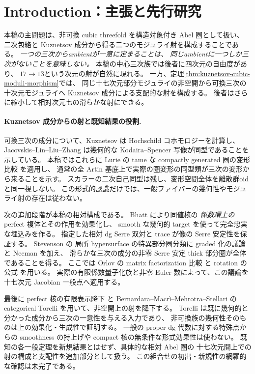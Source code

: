 \documentclass[11pt,a4paper]{ltjsarticle}
\numberwithin{equation}{section}
\begin{document}
\section{Introduction：主張と先行研究}\label{sec:intro}
本稿の主問題は、非可換 cubic threefold を構造対象付き Abel 圏として扱い、
二次包絡と Kuznetsov 成分から得る二つのモジュライ射を構成することである。
\emph{一つの三次からambientが一意に定まることは、
同じambientに一つしか三次がないことを意味しない。}
本稿の中心三次族では後者に四次元の自由度があり、
$17\longrightarrow13$という次元の射が自然に現れる。
一方、定理\ref{thm:kuznetsov-cubic-moduli-morphism}では、
同じ十七次元部分モジュライの非空開から可換三次の十次元モジュライへ
Kuznetsov 成分による支配的な射を構成する。
後者はさらに縮小して相対次元七の滑らかな射にできる。

\paragraph{Kuznetsov 成分からの射と既知結果の役割.}
可換三次の成分について、Kuznetsov \cite[Theorem~8.9]{KuznetsovHochschild}
は Hochschild コホモロジーを計算し、
Jacovskis--Lin--Liu--Zhang \cite[Theorem~4.4(2)]{JLLZInfinitesimal}
は幾何的な Kodaira--Spencer 写像が同型であることを示している。
本稿ではこれらに Lurie の tame な compactly generated 圏の変形比較
\cite[Theorems~5.1.9, 5.3.16 and Proposition~5.3.21]{LurieDAGX} を適用し、
通常の全 Artin 基底上で実際の圏変形の同型類が三次の変形から来ることを示す。
スカラーの二次自己同型は残し、変形空間全体を離散群oidと同一視しない。
この形式的認識だけでは、一般ファイバーの幾何性やモジュライ射の存在は従わない。

次の追加段階が本稿の相対構成である。
Bhatt \cite[Lemma~4.2]{BhattAlgebraization} により同値核の
\emph{係数環上の} perfect 複体とその作用を効果化し、
smooth な幾何的 target を使って完全忠実な埋込みを作る。
指定した相対 dg Serre 双対と trace が像の Serre 安定性を保証する。
Stevenson \cite[Theorem~6.13]{StevensonSingularityActions} の
局所 hypersurface の特異部分圏分類に graded 化の議論と
Neeman \cite[Lemma~2.2]{NeemanCompactLocalization} を加え、
滑らかな三次の成分の非零 Serre 安定 thick 部分圏が全体であることを得る。
ここでは Orlov の matrix factorization 比較
\cite[Theorems~2.5 and~3.10--3.11]{OrlovSingularities} と
rotation の公式 \cite{KuznetsovFractionalCY} を用いる。
実際の有限係数量子化族と非零 Euler 数によって、この議論を
十七次元 Jacobian 一般点へ適用する。

最後に perfect 核の有限表示降下
\cite[Lemma~2.10]{ToenVaquieObjects} と
Bernardara--Macr\`i--Mehrotra--Stellari の categorical Torelli
\cite[Theorem~1.1]{BMMSCubicTorelli} を用いて、非空開上の射を降下する。
Torelli は既に幾何的と分かった成分から三次の一意性を与える入力であり、
非可換族の幾何性そのものは上の効果化・生成性で証明する。
一般の proper dg 代数に対する特殊点からの smoothness の持上げや
compact 核の無条件な形式効果性は使わない。
既知の各一般定理を新規結果とはせず、具体的な相対 Abel 圏の
十七次元開上での射の構成と支配性を追加部分として扱う。
この組合せの初出・新規性の網羅的な確認は未完了である。
\end{document}
